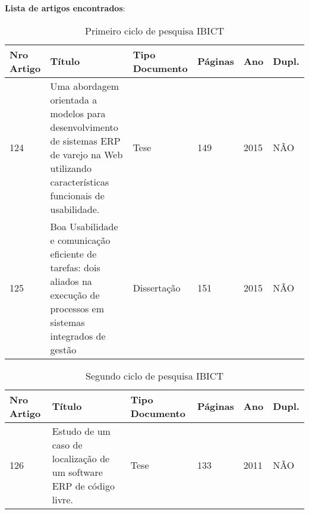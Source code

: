 \begin{landscape}
\noindent \textbf{Lista de artigos encontrados}:

 \begin{longtable}{||p{1.7cm}|p{11.0cm}|p{6.0cm}|p{1.7cm}|p{1cm}|p{1cm}||} %
 \caption{Primeiro ciclo de pesquisa IBICT}
 \label{ltab:teste}
 \\ %
 	\hline
 	Nro Artigo	& Título & Tipo Documento & Páginas & Ano & Dupl. \\ %
  	\hline
	124 & Uma abordagem orientada a modelos para desenvolvimento de sistemas ERP de varejo na Web utilizando características funcionais de usabilidade. & Tese & 149 & 2015 & NÃO \\ 
	\hline
	125 & Boa Usabilidade e comunicação eficiente de tarefas: dois aliados na execução de processos em sistemas integrados de gestão & Dissertação & 151 & 2015 & NÃO 
	\hline
 \end{longtable}
\newline
 \begin{longtable}{||p{1.7cm}|p{11.0cm}|p{6.0cm}|p{1.7cm}|p{1cm}|p{1cm}||} %
	\caption{Segundo ciclo de pesquisa IBICT}
	\label{ltab:teste}
	\\ %
	\hline
	Nro Artigo	& Título & Tipo Documento & Páginas & Ano & Dupl. \\ %
	\hline
	126 & Estudo de um caso de localização de um software ERP de código livre. & Tese & 133 & 2011 & NÃO 
	\hline
\end{longtable}

\end{landscape}